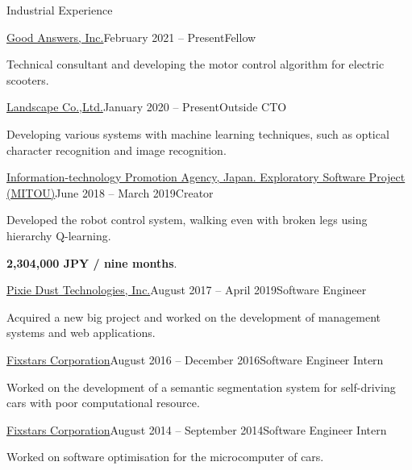 \documentclass{resume} %
\begin{document}
\begin{rSection}{Industrial Experience}

    \begin{rSubsection}{\href{https://info.gbiz.go.jp/hojin/ichiran?hojinBango=2430001082637}{Good Answers, Inc.}}{February 2021 -- Present}{Fellow}{}
    \item Technical consultant and developing the motor control algorithm for electric scooters.
    \end{rSubsection}

    \begin{rSubsection}{\href{https://www.landscape.co.jp/}{Landscape Co.,Ltd.}}{January 2020 -- Present}{Outside CTO}{}
    \item Developing various systems with machine learning techniques, such as optical character recognition and image recognition.
    \end{rSubsection}

    \begin{rSubsection}{\href{https://www.mitou.org/}{Information-technology Promotion Agency, Japan. Exploratory Software Project (MITOU)}}{June 2018 -- March 2019}{Creator}{}
    \item Developed the robot control system, walking even with broken legs using hierarchy Q-learning.
    \item \textbf{2,304,000 JPY / nine months}.
    \end{rSubsection}

    \begin{rSubsection}{\href{http://pixiedusttech.com/}{Pixie Dust Technologies, Inc.}}{August 2017 -- April 2019}{Software Engineer}{}
    \item Acquired a new big project and worked on the development of management systems and web applications.
    \end{rSubsection}

    \begin{rSubsection}{\href{https://www.fixstars.com/en/}{Fixstars Corporation}}{August 2016 -- December 2016}{Software Engineer Intern}{}
    \item Worked on the development of a semantic segmentation system for self-driving cars with poor computational resource.
    \end{rSubsection}

    \begin{rSubsection}{\href{https://www.fixstars.com/en/}{Fixstars Corporation}}{August 2014 -- September 2014}{Software Engineer Intern}{}
    \item Worked on software optimisation for the microcomputer of cars.
    \end{rSubsection}

\end{rSection}
\end{document}
